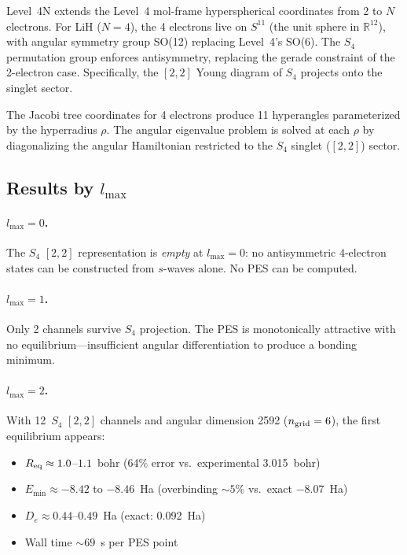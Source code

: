 \documentclass[aps,pra,twocolumn,superscriptaddress,longbibliography,floatfix]{revtex4-2}
\begin{document}
Level~4N extends the Level~4 mol-frame hyperspherical coordinates
from 2 to $N$ electrons.  For LiH ($N=4$), the 4 electrons live on
$S^{11}$ (the unit sphere in $\mathbb{R}^{12}$), with angular
symmetry group SO(12) replacing Level~4's SO(6).  The $S_4$ permutation
group enforces antisymmetry, replacing the gerade constraint of the
2-electron case.  Specifically, the $[2,2]$ Young diagram of $S_4$
projects onto the singlet sector.

The Jacobi tree coordinates for 4 electrons produce 11 hyperangles
parameterized by the hyperradius $\rho$.  The angular eigenvalue
problem is solved at each $\rho$ by diagonalizing the angular
Hamiltonian restricted to the $S_4$ singlet ($[2,2]$) sector.

\subsection{Results by $l_{\max}$}

\paragraph{$l_{\max} = 0$.}
The $S_4$ $[2,2]$ representation is \emph{empty} at $l_{\max} = 0$:
no antisymmetric 4-electron states can be constructed from $s$-waves
alone.  No PES can be computed.

\paragraph{$l_{\max} = 1$.}
Only 2 channels survive $S_4$ projection.  The PES is monotonically
attractive with no equilibrium---insufficient angular differentiation
to produce a bonding minimum.

\paragraph{$l_{\max} = 2$.}
With 12~$S_4$ $[2,2]$ channels and angular dimension 2592
($n_{\rm grid} = 6$), the first equilibrium appears:
\begin{itemize}
  \item $R_{\rm eq} \approx 1.0$--$1.1$~bohr (64\% error vs.\
    experimental 3.015~bohr)
  \item $E_{\min} \approx -8.42$ to $-8.46$~Ha (overbinding
    ${\sim}5\%$ vs.\ exact $-8.07$~Ha)
  \item $D_e \approx 0.44$--$0.49$~Ha (exact: 0.092~Ha)
  \item Wall time ${\sim}69$~s per PES point
\end{itemize}
\end{document}
